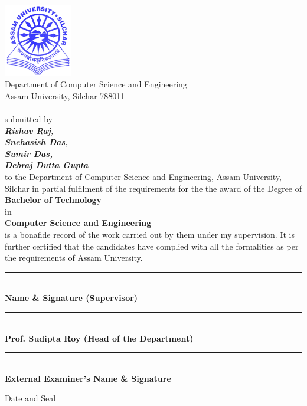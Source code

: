 \documentclass[10pt, oneside, article]{Thesis} %
\begin{document}
\clearpage %


%

\begin{center}
\includegraphics[width=3cm]{Logo.png}\\ %
Department of Computer Science and Engineering \\
Assam University, Silchar-788011\\
 \\  submitted by \\ \textit{\textbf{Rishav Raj,\\ Snehasish Das,\\ Sumir Das, \\ Debraj Dutta Gupta}} \\ to the Department of Computer Science and Engineering, Assam University, Silchar in partial fulfilment of the requirements for the the award of the Degree of\\ \textbf{Bachelor of Technology} \\ in \\ \textbf{Computer Science and Engineering} \\ is a bonafide record of the work carried out by them under my supervision. It is further certified that the candidates have complied with all the formalities as per the requirements of Assam University.\\ \vspace{2cm}


\begin{flushleft}
 \rule[1em]{30em}{0.5pt}\\  \textbf{Name \& Signature (Supervisor)}  \\ \vspace{1cm}
 \rule[1em]{30em}{0.5pt}\\ \textbf{Prof. Sudipta Roy (Head of the Department)}  \\ \vspace{1cm}
\rule[1em]{30em}{0.5pt}\\ \textbf{External Examiner's Name \& Signature}  \\
\begin{flushright}
Date and Seal
\end{flushright}
\end{flushleft} \large


\end{center}
\end{document}
